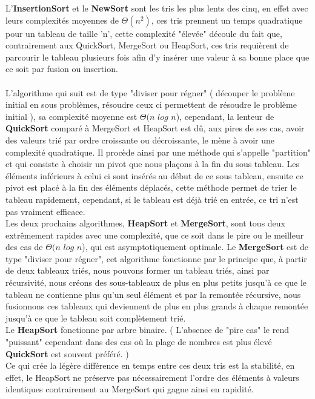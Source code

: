 \documentclass[a4paper, 11pt, oneside]{article}
\begin{document}
L'\textbf{InsertionSort} et le \textbf{NewSort} sont les tris les plus lents des cinq, en effet avec leurs complexités moyennes de $\Theta(n^{2})$, ces tris prennent un temps quadratique pour un tableau de taille 'n', cette complexité "élevée" découle du fait que, contrairement aux QuickSort, MergeSort ou HeapSort, ces tris requièrent de parcourir le tableau plusieurs fois afin d'y insérer une valeur à sa bonne place que ce soit par fusion ou insertion. 
\\ \\
\indent L'algorithme qui suit est de type "diviser pour régner" ( découper le problème initial en sous problèmes, résoudre ceux ci permettent de résoudre le problème initial ), sa complexité moyenne est $\Theta(n$ $log$ $n$), cependant, la lenteur de \textbf{QuickSort} comparé à MergeSort et HeapSort est dû, aux pires de ses cas, avoir des valeurs trié par ordre croissante ou décroissante, le mène à avoir une complexité quadratique. Il procède ainsi par une méthode qui s'appelle "partition" et qui consiste à choisir un pivot que nous plaçons à la fin du sous tableau. Les éléments inférieurs à celui ci sont insérés au début de ce sous tableau, ensuite ce pivot est placé à la fin des éléments déplacés, cette méthode permet de trier le tableau rapidement, cependant, si le tableau est déjà trié en entrée, ce tri n'est pas vraiment efficace.\\ 

Les deux prochains algorithmes, \textbf{HeapSort} et \textbf{MergeSort}, sont tous deux extrêmement rapides avec une complexité, que ce soit dans le pire ou le meilleur des cas de $\Theta(n$ $log$ $n$),  qui est asymptotiquement optimale. Le \textbf{MergeSort} est de type "diviser pour régner", cet algorithme fonctionne par le principe que, à partir de deux tableaux triés, nous pouvons former un tableau triés, ainsi par récursivité, nous créons des sous-tableaux de plus en plus petits jusqu'à ce que le tableau ne contienne plus qu'un seul élément et par la remontée récursive, nous fusionnons ces tableaux qui deviennent de plus en plus grands à chaque remontée jusqu'à ce que le tableau soit complètement trié.\\ Le \textbf{HeapSort} fonctionne par arbre binaire. ( L'absence de "pire cas" le rend "puissant" cependant dans des cas où la plage de nombres est plus élevé \textbf{QuickSort} est souvent préféré. ) \\
Ce qui crée la légère différence en temps entre ces deux tris est la stabilité, en effet, le HeapSort ne préserve pas nécessairement l’ordre des éléments à valeurs identiques contrairement au MergeSort qui gagne ainsi en rapidité.
\end{document}
